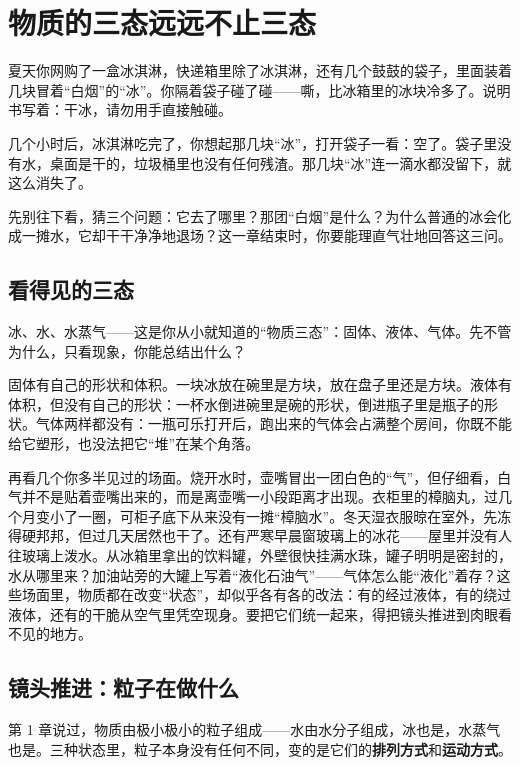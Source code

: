 \chapter{物质的三态远远不止三态}

\begin{kaichang}
夏天你网购了一盒冰淇淋，快递箱里除了冰淇淋，还有几个鼓鼓的袋子，里面装着几块冒着“白烟”的“冰”。你隔着袋子碰了碰——嘶，比冰箱里的冰块冷多了。说明书写着：干冰，请勿用手直接触碰。

几个小时后，冰淇淋吃完了，你想起那几块“冰”，打开袋子一看：空了。袋子里没有水，桌面是干的，垃圾桶里也没有任何残渣。那几块“冰”连一滴水都没留下，就这么消失了。

先别往下看，猜三个问题：它去了哪里？那团“白烟”是什么？为什么普通的冰会化成一摊水，它却干干净净地退场？这一章结束时，你要能理直气壮地回答这三问。
\end{kaichang}

\section{看得见的三态}

冰、水、水蒸气——这是你从小就知道的“物质三态”：固体、液体、气体。先不管为什么，只看现象，你能总结出什么？

固体有自己的形状和体积。一块冰放在碗里是方块，放在盘子里还是方块。液体有体积，但没有自己的形状：一杯水倒进碗里是碗的形状，倒进瓶子里是瓶子的形状。气体两样都没有：一瓶可乐打开后，跑出来的气体会占满整个房间，你既不能给它塑形，也没法把它“堆”在某个角落。

再看几个你多半见过的场面。烧开水时，壶嘴冒出一团白色的“气”，但仔细看，白气并不是贴着壶嘴出来的，而是离壶嘴一小段距离才出现。衣柜里的樟脑丸，过几个月变小了一圈，可柜子底下从来没有一摊“樟脑水”。冬天湿衣服晾在室外，先冻得硬邦邦，但过几天居然也干了。还有严寒早晨窗玻璃上的冰花——屋里并没有人往玻璃上泼水。从冰箱里拿出的饮料罐，外壁很快挂满水珠，罐子明明是密封的，水从哪里来？加油站旁的大罐上写着“液化石油气”——气体怎么能“液化”着存？这些场面里，物质都在改变“状态”，却似乎各有各的改法：有的经过液体，有的绕过液体，还有的干脆从空气里凭空现身。要把它们统一起来，得把镜头推进到肉眼看不见的地方。

\section{镜头推进：粒子在做什么}

第 1 章说过，物质由极小极小的粒子组成——水由水分子组成，冰也是，水蒸气也是。三种状态里，粒子本身没有任何不同，变的是它们的\textbf{排列方式}和\textbf{运动方式}。

